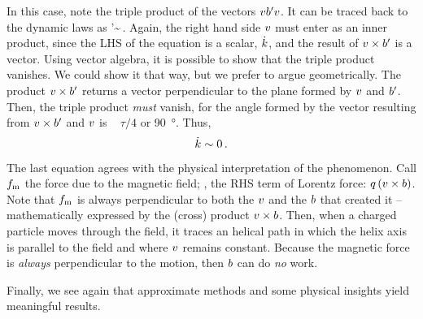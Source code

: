 In this case, note the triple product of the vectors $vb'v$. It can be traced back to the dynamic laws as
%
\beq
  \vel\mfield'\vel \sim {}\iprod\vel\,.
\eeq
%
Again, the right hand side $v$ must enter as an inner product, since the LHS of the equation is a scalar, $\dot{k}$, and the result of $v\times b'$ is a vector. Using vector algebra, it is possible to show that the triple product vanishes. We could show it that way, but we prefer to argue geometrically. The product $v\times b'$ returns a vector perpendicular to the plane formed by $v$ and $b'$. Then, the triple product \emph{must} vanish, for the angle formed by the vector resulting from $v\times b'$ and $v$ is
%
~
%
$\tau/4$ or \SI{90}{\degree}. Thus,
%
\begin{equation}\label{eq:kinenergymagneticfield}
  \dot{k} \sim 0\,.
\end{equation}

The last equation agrees with the physical interpretation of the phenomenon. Call $f_\text{m}$ the force due to the magnetic field; \ie, the RHS term of Lorentz force: $q\left({v\times b}\right)$. Note that $f_\text{m}$ is always perpendicular to both the $v$ and the $b$ that created it -- mathematically expressed by the (cross) product $v\times b$. Then, when a charged particle moves through the field, it traces an helical path in which the helix axis is parallel to the field and where $v$ remains constant. Because the magnetic force is \emph{always} perpendicular to the motion, then $b$ can do \emph{no} work.

Finally, we see again that approximate methods and some physical insights yield meaningful results.


